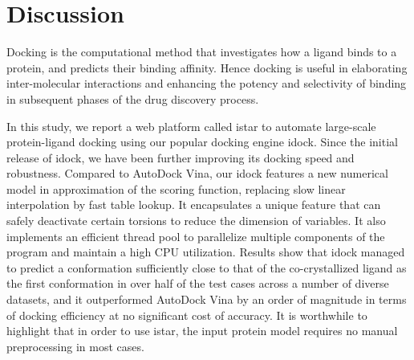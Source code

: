 
\section{Discussion}
Docking is the computational method that investigates how a ligand binds to a protein, and predicts their binding affinity. Hence docking is useful in elaborating inter-molecular interactions and enhancing the potency and selectivity of binding in subsequent phases of the drug discovery process.

In this study, we report a web platform called istar to automate large-scale protein-ligand docking using our popular docking engine idock. Since the initial release of idock, we have been further improving its docking speed and robustness. Compared to AutoDock Vina, our idock features a new numerical model in approximation of the scoring function, replacing slow linear interpolation by fast table lookup. It encapsulates a unique feature that can safely deactivate certain torsions to reduce the dimension of variables. It also implements an efficient thread pool to parallelize multiple components of the program and maintain a high CPU utilization. Results show that idock managed to predict a conformation sufficiently close to that of the co-crystallized ligand as the first conformation in over half of the test cases across a number of diverse datasets, and it outperformed AutoDock Vina by an order of magnitude in terms of docking efficiency at no significant cost of accuracy. It is worthwhile to highlight that in order to use istar, the input protein model requires no manual preprocessing in most cases.

